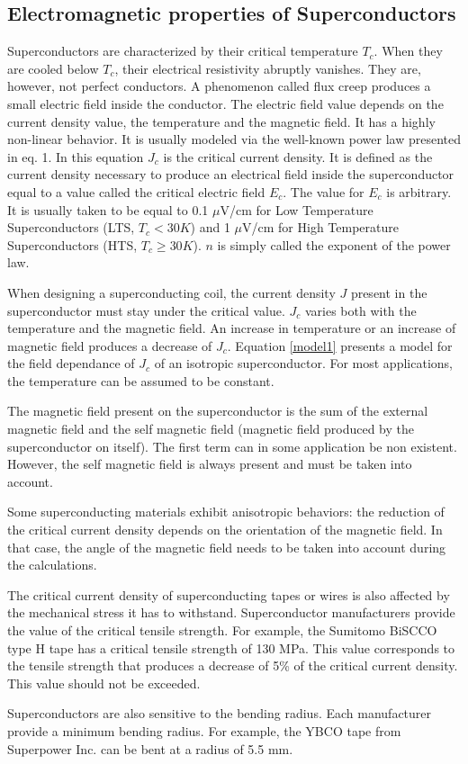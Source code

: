 \documentclass{ws-jmrr}
\begin{document}
\begin{multicols}{2}
\section{Electromagnetic properties of Superconductors}
\label{elec}
Superconductors are characterized by their critical temperature $T_c$. When they are cooled below $T_c$, their electrical resistivity abruptly vanishes. They are, however, not perfect conductors. A phenomenon called flux creep \cite{feigel1989theory} produces a small electric field inside the conductor. The electric field value depends on the current density value, the temperature and the magnetic field. It has a highly non-linear behavior. It is usually modeled via the well-known power law \cite{ONOGI1989991} presented in eq. 1. In this equation $J_ c$ is the critical current density. It is defined as the current density necessary to produce an electrical field inside the superconductor equal to a value called the critical electric field $E_c$. The value for $E_c$ is arbitrary. It is usually taken to be equal to 0.1 $\mu$V/cm for Low Temperature Superconductors (LTS, $T_c<30K$) and 1 $\mu$V/cm for High Temperature Superconductors (HTS, $T_c \geq 30K$). $n$ is simply called the exponent of the power law.\par
When designing a superconducting coil, the current density $J$ present in the superconductor must stay under the critical value. $J_c$ varies both with the temperature and the magnetic field. An increase in temperature or an increase of magnetic field produces a decrease of $J_c$. Equation \ref{model1} presents a model for the field dependance of $J_c$ of an isotropic superconductor. For most applications, the temperature can be assumed to be constant.\par
The magnetic field present on the superconductor is the sum of the external magnetic field and the self magnetic field (magnetic field produced by the superconductor on itself). The first term can in some application be non existent. However, the self magnetic field is always present and must be taken into account. \par
Some superconducting materials exhibit anisotropic behaviors: the reduction of the critical current density depends on the orientation of the magnetic field. In that case, the angle of the magnetic field needs to be taken into account during the calculations.\par
The critical current density of superconducting tapes or wires is also affected by the mechanical stress it has to withstand. Superconductor manufacturers provide the value of the critical tensile strength. For example, the Sumitomo BiSCCO type H tape has a critical tensile strength of 130 MPa. This value corresponds to the tensile strength that produces a decrease of 5\% of the critical current density. This value should not be exceeded.\par
Superconductors are also sensitive to the bending radius. Each manufacturer provide a minimum bending radius. For example, the YBCO tape from Superpower Inc. can be bent at a radius of 5.5 mm.


\end{multicols}
\end{document}
